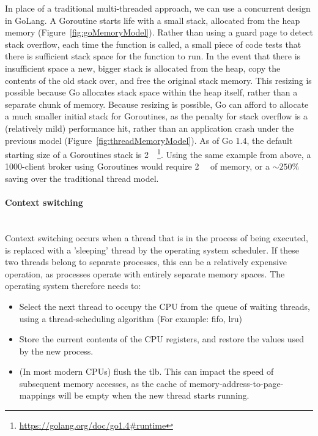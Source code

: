In place of a traditional multi-threaded approach, we can use a concurrent
design in GoLang. A Goroutine starts life with a small stack, allocated from the
heap memory (Figure~\ref{fig:goMemoryModel}). Rather than using a guard page to
detect stack overflow, each time the function is called, a small piece of code
tests that there is sufficient stack space for the function to run. In the event
that there is insufficient space a new, bigger stack is allocated from the heap,
copy the contents of the old stack over, and free the original stack memory.
This resizing is possible because Go allocates stack space within the heap
itself, rather than a separate chunk of memory. Because resizing is possible, Go
can afford to allocate a much smaller initial stack for Goroutines, as the
penalty for stack overflow is a (relatively mild) performance hit, rather than
an application crash under the previous model
(Figure~\ref{fig:threadMemoryModel}). As of Go 1.4, the default starting size of
a Goroutines stack is
\SI{2}{\kibi\byte}\footnote{\url{https://golang.org/doc/go1.4\#runtime}}. Using
the same example from above, a 1000-client broker using Goroutines would require
\SI{2}{\mebi\byte} of memory, or a $\sim250\%$ saving over the traditional
thread model.

\paragraph{Context switching} \mbox{}\\

Context switching occurs when a thread that is in the process of being executed,
is replaced with a 'sleeping' thread by the operating system scheduler. If
these two threads belong to separate processes, this can be a relatively
expensive operation, as processes operate with entirely separate memory spaces.
The operating system therefore needs to:
\begin{itemize}
  \item Select the next thread to occupy the CPU from the queue of waiting
  threads, using a thread-scheduling algorithm (For example: \gls{fifo},
  \gls{lru})
  \item Store the current contents of the CPU registers, and restore the values
  used by the new process.
  \item (In most modern CPUs) flush the \gls{tlb}\cite{taggedTLB}. This can
  impact the speed of subsequent memory accesses, as the cache of
  memory-address-to-page-mappings will be empty when the new thread starts
  running.
\end{itemize}

